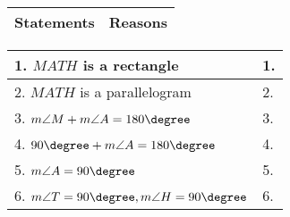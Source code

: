 \begin{tabularx}{\textwidth}{|Y|Y|}
\hline
\textbf{Statements} & \textbf{Reasons}  \\
\hline
\end{tabularx} 
\begin{tabularx}{\textwidth}{|X|X|}
\hline 
1. \(MATH\) is a rectangle & 1. \\
 \hline 
 2. \(MATH\) is a parallelogram & 2. \\
 \hline
 3. $ m\angle{M} + m\angle{A} = 180\degree $ & 3. \\
 \hline
 4. $ 90\degree + m\angle{A} = 180\degree $ & 4. \\
 \hline
 5. $ m\angle{A} = 90\degree $ & 5. \\
 \hline
 6. \(m\angle{T} = 90\degree, m\angle{H} = 90\degree\) & 6. \\
 \hline
\end{tabularx} 
